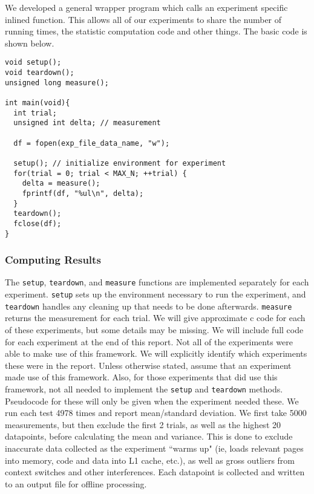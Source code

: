 We developed a general wrapper program which calls an experiment specific inlined function.
This allows all of our experiments to share the number of running times, the statistic computation code and other things.
The basic code is shown below.

\begin{verbatim}
void setup();
void teardown();
unsigned long measure();

int main(void){
  int trial;
  unsigned int delta; // measurement

  df = fopen(exp_file_data_name, "w");

  setup(); // initialize environment for experiment
  for(trial = 0; trial < MAX_N; ++trial) {
    delta = measure();
    fprintf(df, "%ul\n", delta);
  }
  teardown();
  fclose(df);
}
\end{verbatim}

\subsubsection{Computing Results}

The {\tt setup}, {\tt teardown}, and {\tt measure} functions are implemented separately for each experiment. {\tt setup} sets up the environment necessary to run the experiment, and {\tt teardown} handles any cleaning up that needs to be done afterwards. {\tt measure} returns the measurement for each trial. We will give approximate c code for each of these experiments, but some details may be missing. We will include full code for each experiment at the end of this report.
\newline
\newline
Not all of the experiments were able to make use of this framework. We will explicitly identify which experiments these were in the report. Unless otherwise stated, assume that an experiment made use of this framework. Also, for those experiments that did use this framework, not all needed to implement the {\tt setup} and {\tt teardown} methods. Pseudocode for these will only be given when the experiment needed these.
\newline
\newline
We run each test 4978 times and report mean/standard deviation. We first take 5000 measurements, but then exclude the first 2 trials, as well as the highest 20 datapoints, before calculating the mean and variance. This is done to exclude inaccurate data collected as the experiment ``warms up" (ie, loads relevant pages into memory, code and data into L1 cache, etc.), as well as gross outliers from context switches and other interferences.
\newline
\newline
Each datapoint is collected and written to an output file for offline processing.

